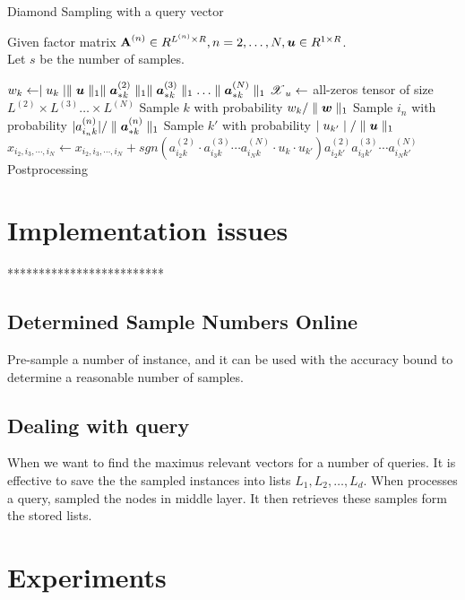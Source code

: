 \documentclass{article}
\newcommand{\Sca}[3]{{#1}^{(#2)}_{i_#2#3}}%
\newcommand{\T}[1]{\boldsymbol{\mathscr{\MakeUppercase{#1}}}}%
\newcommand{\V}[1]{{\bm{{\MakeLowercase{#1}}}}}%
\newcommand{\Vacol}[1]{\V{a}^{(#1)}_{*k}}
\newcommand{\M}[1]{{\bm{\mathbf{\MakeUppercase{#1}}}}}%
\newcommand{\norm}[2]{\parallel#1\parallel_{#2}}
\begin{document}
\begin{algorithm}[ht]
    \caption{Diamond Sampling with a query vector}
    \label{alg:DSamplingU}
    Given factor matrix $\M{A}^{(n)}\in R^{L^{(n)}\times R}, n = 2,\ldots,N,\V{U}\in R^{1\times R}$.\\
    Let $s$ be the number of samples.
    \begin{algorithmic}[1]
    \State \label{line:StartU}
    $w_k \leftarrow \mid u_k \mid\norm{\V{U}}{1}
    \norm{\Vacol{2}}{1}\norm{\Vacol{3}}{1}\ldots\norm{\Vacol{N}}{1} $
    \EndFor
    \State $\T{X}_u \leftarrow$ all-zeros tensor of size
    $L^{(2)}\times L^{(3)}\ldots\times L^{(N)}$
    \State Sample $k$ with probability $w_k/\norm{\V{w}}{1}$
    \label{line:Samplek}
    \State Sample $i_n$ with probability $|\Sca{a}{n}{k}|/\norm{\Vacol{n}}{1}$
    \label{line:in}
    \EndFor
    \State Sample $k'$ with probability $\mid u_{k'}\mid/\norm{\V{U}}{1}$
    \label{line:kp}
    \State $x_{i_2,i_3,\cdots,i_N}\leftarrow x_{i_2,i_3,\cdots,i_N} +
    sgn(\Sca{a}{2}{k}\cdot\Sca{a}{3}{k}\cdots\Sca{a}{N}{k}\cdot u_k\cdot u_{k'})
    \Sca{a}{2}{k'}\Sca{a}{3}{k'}\cdots\Sca{a}{N}{k'}$
    \label{line:update}
    \EndFor
    \State Postprocessing
    \end{algorithmic}
\end{algorithm}



\section{Implementation issues}
*************************\\
\subsection{Determined Sample Numbers Online }
Pre-sample a number of instance, and it can be used with the accuracy bound to determine a reasonable number of samples.
\subsection{Dealing with query}
When we want to find the maximus relevant vectors for a number of queries. It is effective to save the the sampled instances into lists $L_1,L_2,\ldots,L_d$. When processes a query, sampled the nodes in middle layer. It then retrieves these samples form the stored lists.
\section{Experiments}
\end{document}
